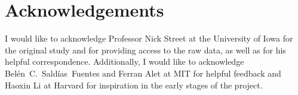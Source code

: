 \documentclass{article}
\begin{document}
	\section*{Acknowledgements}
	
	I would like to acknowledge Professor Nick Street at the University of Iowa for the original study and for providing access to the raw data, as well as for his helpful correspondence. Additionally, I would like to acknowledge Belén C. Saldías Fuentes and Ferran Alet at MIT for helpful feedback and Haoxin Li at Harvard for inspiration in the early stages of the project. 
	
	
	
	
	
	
\end{document}

